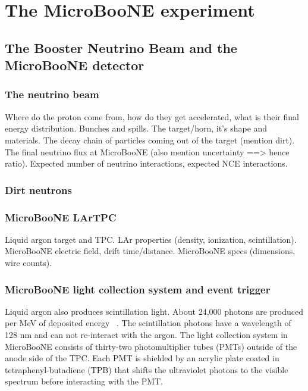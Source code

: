 \section{The MicroBooNE experiment}\label{microboone}

\subsection{The Booster Neutrino Beam and the MicroBooNE detector}\label{sec:beam}
  \subsubsection{The neutrino beam}
    Where do the proton come from, how do they get accelerated, what is their
    final energy distribution.
    Bunches and spills.
    The target/horn, it's shape and materials.
    The decay chain of particles coming out of the target (mention dirt).
    The final neutrino flux at MicroBooNE (also mention uncertainty ==> hence ratio).
    Expected number of neutrino interactions, expected NCE interactions.

  \subsubsection{Dirt neutrons}

  \subsubsection{MicroBooNE LArTPC}\label{sec:lartpc}
    Liquid argon target and TPC.
    LAr properties (density, ionization, scintillation).
    MicroBooNE electric field, drift time/distance.
    MicroBooNE specs (dimensions, wire counts).

  \subsubsection{MicroBooNE light collection system and event trigger}\label{sec:swtrigger}
    Liquid argon also produces scintillation light. About 24,000 photons are
    produced per MeV of deposited energy ~\cite{detectorpaper}. The
    scintillation photons have a wavelength of 128 nm and can not re-interact
    with the argon. The light collection system in MicroBooNE consists of
    thirty-two photomultiplier tubes (PMTs) outside of the anode side of the
    TPC. Each PMT is shielded by an acrylic plate coated in
    tetraphenyl-butadiene (TPB) that shifts the ultraviolet photons to the
    visible spectrum before interacting with the PMT.

